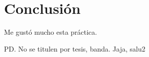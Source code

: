 \chapter{Conclusión}

Me gustó mucho esta práctica.

PD. No se titulen por tesis, banda. Jaja, salu2